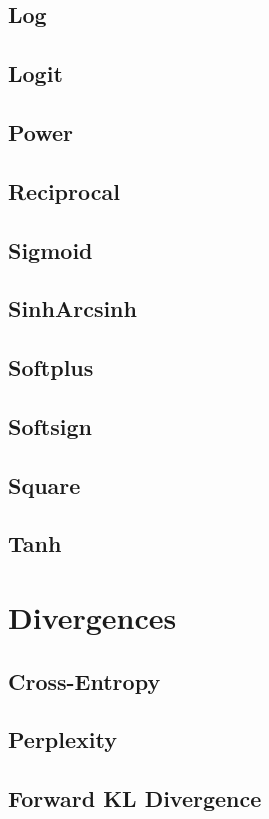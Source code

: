 \documentclass{article}
\begin{document}
\subsection{Log}
\subsection{Logit}
\subsection{Power}
\subsection{Reciprocal}
\subsection{Sigmoid}
\subsection{SinhArcsinh}
\subsection{Softplus}
\subsection{Softsign}
\subsection{Square}
\subsection{Tanh}

\section{Divergences}
\subsection{Cross-Entropy}
\subsection{Perplexity}
\subsection{Forward KL Divergence}
\end{document}

